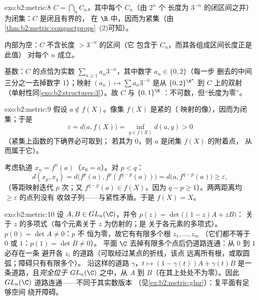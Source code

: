 \begin{solution}{exo:b2:metric:8}
$C = \bigcap_n C_n$，其中每个 $C_n$（由 $2^n$ 个
长度为 $3^{-n}$ 的闭区间之并）为闭集：$C$ 是闭且有界的，
在 $\R$ 中，因而为紧集（由\cref{thm:b2:metric:compactprops}~(2)可知）。

内部为空：$C$ 不含长度 $> 3^{-n}$ 的区间（它
包含于 $C_n$，而其各组成区间长度正是此值）
对每个 $n$ 成立。

基数：$C$ 的点恰为实数 $\sum_{n\geq1}
a_n 3^{-n}$，其中数字 $a_n \in \{0, 2\}$（每一步
删去的中间三分之一去掉数字 $1$）；映射 $(a_n) \mapsto
\sum a_n 3^{-n}$ 是从 $\{0,2\}^{\N^*}$ 到 $C$ 上的双射
（单射性同\cref{exo:b2:structures:3}）。故 $C$ 与
$\{0,1\}^{\N}$ ：不可数，但“长度为零”。
\end{solution}

\begin{solution}{exo:b2:metric:9}
假设 $a \notin f(X)$。像集 $f(X)$ 是紧的（
映射的像），因而为闭集；于是
\[
\varepsilon = d\bigl(a, f(X)\bigr)
= \inf_{y \in f(X)} d(a, y) > 0
\]
（紧集上函数的下确界必可取到；
若其为 $0$，则 $a$ 是闭集 $f(X)$ 的附着点，
从而属于它）。

考虑轨道 $x_n = f^n(a)$（$x_0 = a$）。对 $p < q$：
\[
d(x_p, x_q) = d\bigl(f^p(a), f^p(f^{q-p}(a))\bigr)
= d\bigl(a, f^{q-p}(a)\bigr) \geq \varepsilon,
\]
（等距映射迭代 $p$ 次；又 $f^{q-p}(a) \in f(X)$，因为 $q - p
\geq 1$）。两两距离均 $\geq \varepsilon$ 的点列没有
收敛子列——与紧性矛盾。于是 $f(X) =
X$。
\end{solution}

\begin{solution}{exo:b2:metric:10}
设 $A, B \in GL_n(\C)$，并令 $p(z) = \det\bigl((1-z)A + zB\bigr)$：
关于 $z$ 的多项式（每个元素关于 $z$ 为仿射的；是
关于各元素的多项式）。$p(0) = \det A \neq 0$：$p$ 不
恒为零，故它有有限多个根 $z_1, \dots, z_m$
（它们都不等于 $0$ 或 $1$：$p(1) = \det B \neq 0$）。
平面 $\C$ 去掉有限多个点后仍道路连通：从 $0$ 到 $1$ 必存在一条
避开各 $z_i$ 的道路（可取经过某点的折线，该点
远离所有根，或取圆弧；障碍只有有限多个）。
沿这样的道路 $\gamma$，$t \mapsto (1 - \gamma(t))A +
\gamma(t)B$ 是一条道路，且\emph{完全位于} $GL_n(\C)$ 之中，从 $A$
到 $B$（在其上处处不为零）。因此 $GL_n(\C)$
道路连通——不同于其实数版本
（见\cref{ex:b2:metric:glnr}）：复平面有足够空间
绕开障碍。
\end{solution}

